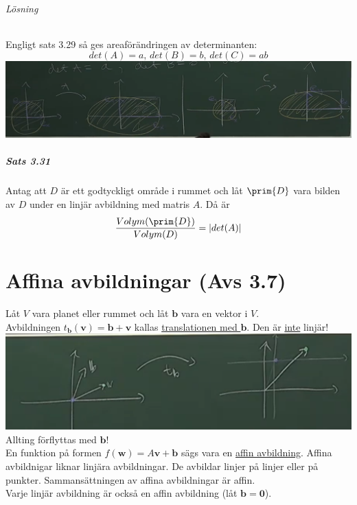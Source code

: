 \subparagraph{Lösning} Engligt sats 3.29 så ges areaförändringen av determinanten:
\begin{equation*}
    det(A)=a\text{, }det(B)=b\text{, }det(C)=ab
\end{equation*}
\includegraphics[scale=0.2]{imgs/img05.png}

\paragraph{Sats 3.31} Antag att $D$ är ett godtyckligt område i rummet och låt $\prim{D}$ vara bilden av $D$ under en linjär avbildning med matris $A$.
Då är
\begin{equation*}
    \frac{Volym(\prim{D})}{Volym(D)}=|det(A)|
\end{equation*}

\chapter{Affina avbildningar (Avs 3.7)}
Låt $V$ vara planet eller rummet och låt $\bm{b}$ vara en vektor i $V$.\\
Avbildningen $t_{\bm{b}}(\bm{v})=\bm{b}+\bm{v}$ kallas \underline{translationen med $\bm{b}$}.
Den är \underline{inte} linjär!\\
\includegraphics[scale=0.5]{imgs/img06.png}\\
Allting förflyttas med $\bm{b}$!\\
En funktion på formen $f(\bm{w})=A\bm{v}+\bm{b}$ sägs vara en \underline{affin avbildning}.
Affina avbildnigar liknar linjära avbildningar.
De avbildar linjer på linjer eller på punkter.
Sammansättningen av affina avbildningar är affin.\\
Varje linjär avbildning är också en affin avbildning (låt $\bm{b}=\bm{0}$).

